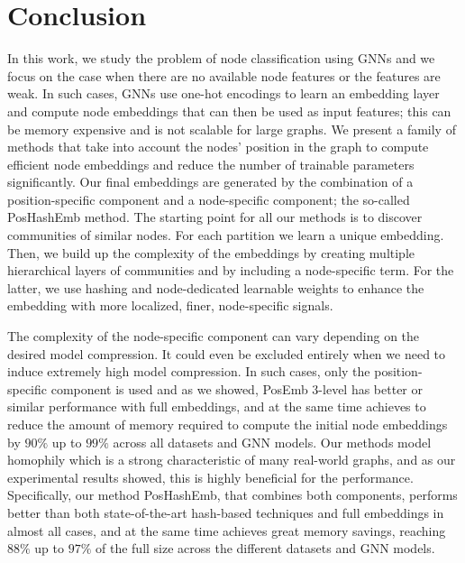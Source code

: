 \documentclass[conference]{IEEEtran}
\begin{document}
\section{Conclusion}
\label{conclusion}
In this work, we study the problem of node classification using GNNs and we focus on the case when there are no available node features or the features are weak. In such cases, GNNs use one-hot encodings to learn an embedding layer and compute node embeddings that can then be used as input features; this can be memory expensive and is not scalable for large graphs. We present a family of methods that take into account the nodes' position in the graph to compute efficient node embeddings and reduce the number of trainable parameters significantly. 
Our final embeddings are generated by the combination of a position-specific component and a node-specific component; the so-called PosHashEmb method.
% 
The starting point for all our methods is to discover communities of similar nodes. For each partition we learn a unique embedding. Then, we build up the complexity of the embeddings by creating multiple hierarchical layers of communities and by including a node-specific term. For the latter, we use hashing and node-dedicated learnable weights to enhance the embedding with more localized, finer, node-specific signals. 

The complexity of the node-specific component can vary depending on the desired model compression. It could even be excluded entirely when we need to induce extremely high model compression. In such cases, only the position-specific component is used and as we showed, PosEmb $3$-level has better or similar performance with full embeddings, and at the same time achieves to reduce the amount of memory required to compute the initial node embeddings by $90\%$ up to $99\%$ across all datasets and GNN models.
Our methods model homophily which is a strong characteristic of many real-world graphs, and as our experimental results showed, this is highly beneficial for the performance. Specifically, our method PosHashEmb, that combines both components, performs better than both state-of-the-art hash-based techniques and full embeddings in almost all cases, and at the same time achieves great memory savings, reaching $88\%$ up to $97\%$ of the full size across the different datasets and GNN models.  

\end{document}
